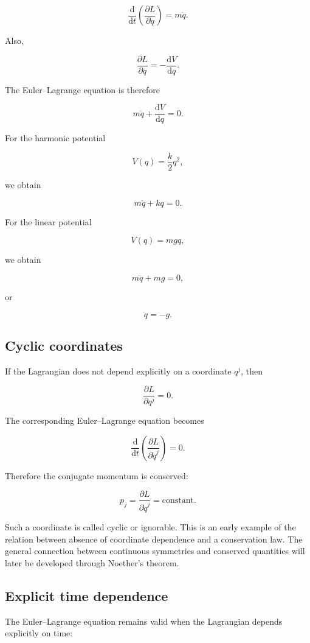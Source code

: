 \[
\frac{\mathrm{d}}{\mathrm{d}t}
\left(
\frac{\partial L}{\partial\dot q}
\right)
=
m\ddot q.
\]

Also,

\[
\frac{\partial L}{\partial q}
=
-\frac{\mathrm{d}V}{\mathrm{d}q}.
\]

The Euler--Lagrange equation is therefore

\[
m\ddot q
+
\frac{\mathrm{d}V}{\mathrm{d}q}
=0.
\]

For the harmonic potential

\[
V(q)
=
\frac{k}{2}q^{2},
\]

we obtain

\[
m\ddot q+kq=0.
\]

For the linear potential

\[
V(q)=mgq,
\]

we obtain

\[
m\ddot q+mg=0,
\]

or

\[
\ddot q=-g.
\]

\subsection{Cyclic coordinates}

If the Lagrangian does not depend explicitly on a coordinate \(q^{j}\), then

\[
\frac{\partial L}{\partial q^{j}}=0.
\]

The corresponding Euler--Lagrange equation becomes

\[
\frac{\mathrm{d}}{\mathrm{d}t}
\left(
\frac{\partial L}{\partial\dot q^{j}}
\right)
=0.
\]

Therefore the conjugate momentum is conserved:

\[
\boxed{
p_{j}
=
\frac{\partial L}{\partial\dot q^{j}}
=
\text{constant}
}.
\]

Such a coordinate is called cyclic or ignorable. This is an early example of the relation between absence of coordinate dependence and a conservation law. The general connection between continuous symmetries and conserved quantities will later be developed through Noether's theorem.

\subsection{Explicit time dependence}

The Euler--Lagrange equation remains valid when the Lagrangian depends explicitly on time:

